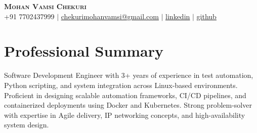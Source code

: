 \documentclass[letterpaper,11pt]{article}
\begin{document}
\begin{center}
    \textbf{\Huge \scshape Mohan Vamsi Chekuri} \\ \vspace{1pt}
    \small +91 7702437999 $|$ \href{mailto:chekurimohanvamsi@gmail.com}{\underline{chekurimohanvamsi@gmail.com}} $|$
    \href{https://www.linkedin.com/in/mvamsi73}{\underline{linkedin}} $|$
    \href{https://github.com}{\underline{github}}
\end{center}

\section{Professional Summary}
Software Development Engineer with 3+ years of experience in test automation, Python scripting, and system integration across Linux-based environments. Proficient in designing scalable automation frameworks, CI/CD pipelines, and containerized deployments using Docker and Kubernetes. Strong problem-solver with expertise in Agile delivery, IP networking concepts, and high-availability system design.
\end{document}
